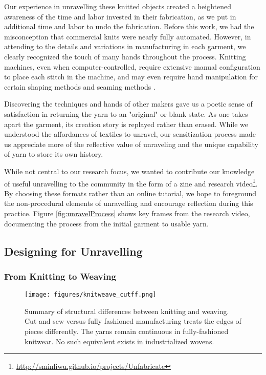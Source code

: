 \documentclass{sigchi}
\begin{document}

Our experience in unravelling these knitted objects created a heightened awareness of the time and labor invested in their fabrication, as we put in additional time and labor to undo the fabrication. Before this work, we had the misconception that commercial knits were nearly fully automated. However, in attending to the details and variations in manufacturing in each garment, we clearly recognized the touch of many hands throughout the process. Knitting machines, even when computer-controlled, require extensive manual configuration to place each stitch in the machine, and may even require hand manipulation for certain shaping methods and seaming methods \cite{rowan_machineknitting}.

Discovering the techniques and hands of other makers gave us a poetic sense of satisfaction in returning the yarn to an "original" or blank state. As one takes apart the garment, its creation story is replayed rather than erased. While we understood the affordances of textiles to unravel, our sensitization process made us appreciate more of the reflective value of unraveling and the unique capability of yarn to store its own history. 

While not central to our research focus, we wanted to contribute our knowledge of useful unravelling to the community in the form of a zine and research video\footnote{\url{http://sminliwu.github.io/projects/Unfabricate}}. By choosing these formats rather than an online tutorial, we hope to foreground the non-procedural elements of unravelling and encourage reflection during this practice. Figure \ref{fig:unravelProcess} shows key frames from the research video, documenting the process from the initial garment to usable yarn.  

\subsection{Designing for Unravelling}

\subsubsection{From Knitting to Weaving}

\begin{figure}
    \centering
    \texttt{[image: figures/knitweave\_cutff.png]}
    \hspace{0.3\linewidth}
    \caption{Summary of structural differences between knitting and weaving. Cut and sew versus fully fashioned manufacturing treats the edges of pieces differently. The yarns remain continuous in fully-fashioned knitwear. No such equivalent exists in industrialized wovens.}
    \label{fig:cutcont_knitweave}
    \vspace{-1em}
\end{figure}
\end{document}
